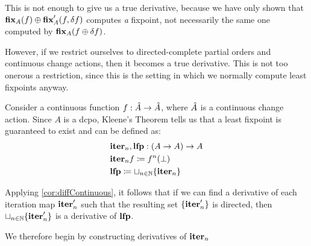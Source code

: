 \fi

This is not enough to give us a true derivative, because we have only shown
that $\textbf{fix}_A(f) \oplus \textbf{fix}_A'(f, \delta f)$ computes \emph{a} fixpoint, not necessarily
the same one computed by $\textbf{fix}_A{(f \oplus \delta f)}$.

However, if we restrict ourselves to directed-complete partial orders and
continuous change actions, then it becomes a true derivative. This is not too
onerous a restriction, since this is the setting in which we normally compute
least fixpoints anyway.

Consider a continuous function $f : \hat{A} \rightarrow \hat{A}$, where $\hat{A}$ is a continuous change action. Since $A$
is a dcpo, Kleene's Theorem tells us that a least fixpoint is guaranteed to exist and can be defined as:
\begin{align*}
  &\textbf{iter}_n, \textbf{lfp} : (A \rightarrow A) \rightarrow A\\
  &\textbf{iter}_n f \coloneqq f^n(\bot)\\
  &\textbf{lfp} \coloneqq \sqcup_{n \in \mathbb{N}} \{ \textbf{iter}_n \}
\end{align*}

Applying \cref{cor:diffContinuous}, it follows that if we can find a derivative of each iteration map $\textbf{iter}_n'$ such that the resulting
set $\{ \textbf{iter}_n' \}$ is directed, then $\sqcup_{n \in \mathbb{N}}
\{\textbf{iter}_n' \}$ is a derivative of $\textbf{lfp}$.

We therefore begin by constructing derivatives of $\textbf{iter}_n$

